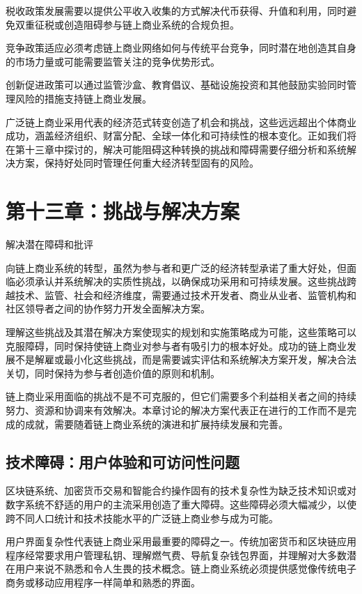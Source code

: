 \documentclass[
  Letterpaper,
]{scrbook}
\begin{document}
税收政策发展需要以提供公平收入收集的方式解决代币获得、升值和利用，同时避免双重征税或创造阻碍参与链上商业系统的合规负担。

竞争政策适应必须考虑链上商业网络如何与传统平台竞争，同时潜在地创造其自身的市场力量或可能需要监管关注的竞争优势形式。

创新促进政策可以通过监管沙盒、教育倡议、基础设施投资和其他鼓励实验同时管理风险的措施支持链上商业发展。

广泛链上商业采用代表的经济范式转变创造了机会和挑战，这些远远超出个体商业成功，涵盖经济组织、财富分配、全球一体化和可持续性的根本变化。正如我们将在第十三章中探讨的，解决可能阻碍这种转换的挑战和障碍需要仔细分析和系统解决方案，保持好处同时管理任何重大经济转型固有的风险。

\chapter{第十三章：挑战与解决方案}\label{sec-challenges-solutions}

解决潜在障碍和批评

向链上商业系统的转型，虽然为参与者和更广泛的经济转型承诺了重大好处，但面临必须承认并系统解决的实质性挑战，以确保成功采用和可持续发展。这些挑战跨越技术、监管、社会和经济维度，需要通过技术开发者、商业从业者、监管机构和社区领导者之间的协作努力开发全面解决方案。

理解这些挑战及其潜在解决方案使现实的规划和实施策略成为可能，这些策略可以克服障碍，同时保持使链上商业对参与者有吸引力的根本好处。成功的链上商业发展不是解雇或最小化这些挑战，而是需要诚实评估和系统解决方案开发，解决合法关切，同时保持为参与者创造价值的原则和机制。

链上商业采用面临的挑战不是不可克服的，但它们需要多个利益相关者之间的持续努力、资源和协调来有效解决。本章讨论的解决方案代表正在进行的工作而不是完成的成就，需要随着链上商业系统的演进和扩展持续发展和完善。

\section{技术障碍：用户体验和可访问性问题}\label{ux6280ux672fux969cux788dux7528ux6237ux4f53ux9a8cux548cux53efux8bbfux95eeux6027ux95eeux9898}

区块链系统、加密货币交易和智能合约操作固有的技术复杂性为缺乏技术知识或对数字系统不舒适的用户的主流采用创造了重大障碍。这些障碍必须大幅减少，以使跨不同人口统计和技术技能水平的广泛链上商业参与成为可能。

用户界面复杂性代表链上商业采用最重要的障碍之一。传统加密货币和区块链应用程序经常要求用户管理私钥、理解燃气费、导航复杂钱包界面，并理解对大多数潜在用户来说不熟悉和令人生畏的技术概念。链上商业系统必须提供感觉像传统电子商务或移动应用程序一样简单和熟悉的界面。
\end{document}
